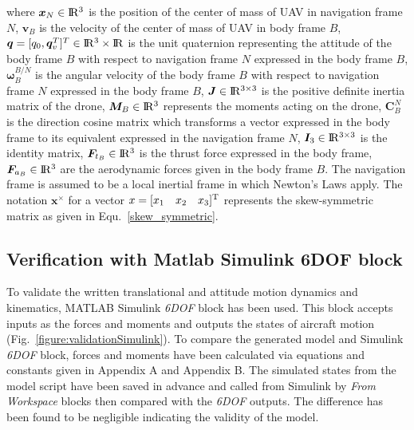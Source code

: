 where $\bm{x}_{N} \in {\rm I\!R^3}  $ is the position of the center of mass of UAV in navigation frame $N$, $\bm{v}_B$ is the velocity of the center of mass of UAV in body frame $B$,  $\bm{q} = [q_0, \bm{q}_v^T] ^T \in {\rm I\!R^3} \times {\rm I\!R}$ is the unit quaternion representing the attitude of the body frame $B$ with respect to navigation frame $N$ expressed in the body frame $B$, $\bm{\omega}^{B/N}_B$ is the angular velocity of the body frame $B$ with respect to navigation frame $N$ expressed in the body frame $B$, $ \bm{J} \in {\rm I\!R^{3\times3}}  $ is the positive definite inertia matrix of the drone, $\bm{M}_B \in {\rm I\!R^3}$ represents the moments acting on the drone, $ \bm{C}_B^N$ is the direction cosine matrix which transforms a vector expressed in the body frame to its equivalent expressed in the navigation frame $N$, $\bm{I}_3  \in {\rm I\!R^{3\times3}}$ is the identity matrix, $\bm{F}_{t_B} \in {\rm I\!R^3}$ is the thrust force expressed in the body frame,  $\bm{F}_{a_B} \in {\rm I\!R^3}$ are the aerodynamic forces given in the body frame $B$. 
The navigation frame is assumed to be a local inertial frame in which Newton's Laws apply. 
The notation $\bm{x} ^{\times} $ for a vector $x = [x_1 \quad x_2 \quad x_3]^ {\rm{T}}$ represents the skew-symmetric matrix as given in Equ.~\ref{skew_symmetric}.

\subsection{Verification with Matlab Simulink 6DOF block}

To validate the written translational and attitude motion dynamics and kinematics, MATLAB Simulink \textit{6DOF} block has been used.
This block accepts inputs as the forces and moments and outputs the states of aircraft motion (Fig.~\ref{figure:validationSimulink}).
To compare the generated model and Simulink \textit{6DOF} block, forces and moments have been calculated via equations and constants given in Appendix A and Appendix B.
The simulated states from the model script have been saved in advance and called from Simulink by \textit{From Workspace} blocks then compared with the \textit{6DOF} outputs.
The difference has been found to be negligible indicating the validity of the model. 


